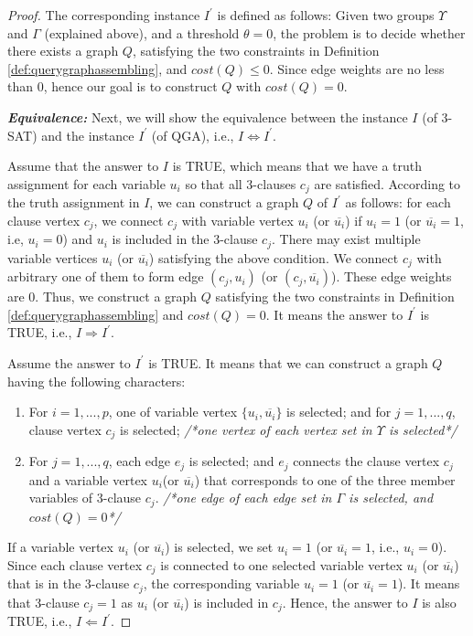 \begin{proof}
	The corresponding instance $I^{\prime}$ is defined as follows: Given two groups $\Upsilon$ and $\Gamma$ (explained above), and a threshold $\theta=0$, the problem is to decide whether there exists a graph $Q$, satisfying the two constraints in Definition \ref{def:querygraphassembling}, and $cost(Q)\leq 0$. Since edge weights are no less than 0, hence our goal is to construct $Q$ with $cost(Q)=0$.
	
	\textbf{\emph{Equivalence:}}
	Next, we will show the equivalence between the instance $I$ (of 3-SAT) and the instance $I^{\prime}$ (of QGA), i.e., $I \Leftrightarrow I^{\prime}$.

	Assume that the answer to $I$ is TRUE, which means that we have a truth assignment for each variable $u_i$ so that all 3-clauses $c_j$ are satisfied. According to the truth assignment in $I$, we can construct a graph $Q$ of $I^{\prime}$ as follows: for each clause vertex $c_j$, we connect $c_j$ with variable vertex $u_i$ (or $\overline{u_i}$) if $u_i=1$ (or $\overline{u_i}=1$, i.e, $u_i=0$) and $u_i$ is included in the 3-clause $c_j$. There may exist multiple variable vertices $u_i$  (or $\overline{u_i}$) satisfying the above condition. We connect $c_j$ with arbitrary one of them to form edge $(c_j,u_i)$ (or $(c_j,\overline{u_i})$).
	These edge weights are 0. 
	Thus, we construct a graph $Q$ satisfying the two constraints in Definition \ref{def:querygraphassembling} and $cost(Q)=0$.	It means the answer to $I^{\prime}$ is TRUE, i.e., $I \Rightarrow I^{\prime}$.
	
	Assume the answer to $I^{\prime}$ is TRUE. It means that we can construct a graph $Q$ having the following characters:
	\begin{enumerate}
		\item For $i=1,...,p$, one of variable vertex $\{u_i, \overline{u_i}\}$ is selected; and for $j=1,...,q$, clause vertex $c_j$ is selected; \emph{/*one vertex of each vertex set in $\Upsilon$ is selected*/}
		\item For $j=1,...,q$, each edge $e_j$ is selected; and $e_j$ connects the clause vertex $c_j$ and a variable vertex $u_i$(or $\overline{u_i}$) that corresponds to one of the three member variables of 3-clause $c_j$.  \emph{/*one edge of each edge set in $\Gamma$ is selected, and $cost(Q)=0$*/}
	\end{enumerate} 
	If a variable vertex $u_i$ (or $\overline{u_i}$) is selected, we set $u_i=1$ (or $\overline{u_i}=1$, i.e., $u_i=0$).  
	Since each clause vertex $c_j$ is connected to one selected variable vertex $u_i$ (or $\overline{u_i}$) that is in the 3-clause $c_j$, the corresponding variable $u_i=1$ (or $\overline{u_i}=1$). It means that 3-clause $c_j=1$ as $u_i$ (or $\overline{u_i}$) is included in $c_j$.  Hence, the answer to $I$ is also TRUE, i.e., $I \Leftarrow I^{\prime}$.
	

\end{proof}
